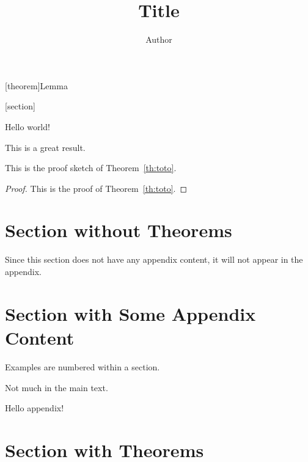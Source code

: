 \usepackage{hyperref}

[theorem]{Lemma}

[section]

\renewcommand{\appendixsectionformat}[2]{Material for #2 (Section~#1)}

\title{Title}
\author{Author}



\maketitle

Hello world!

\begin{theoremrep}
  \label{th:toto}
  This is a great result.
\end{theoremrep}

\begin{proofsketch}
  This is the proof sketch of Theorem~\ref{th:toto}.
\end{proofsketch}

\begin{proof}
  This is the proof of Theorem~\ref{th:toto}.
\end{proof}

\section{Section without Theorems}

Since this section does not have any appendix content, it will not appear in the
appendix. \cite{brin1998anatomy}

\section{Section with Some Appendix Content}

\begin{example}
  Examples are numbered within a section.
\end{example}

Not much in the main text.

\begin{toappendix}
  Hello appendix!
\end{toappendix}

\section{Section with Theorems}

